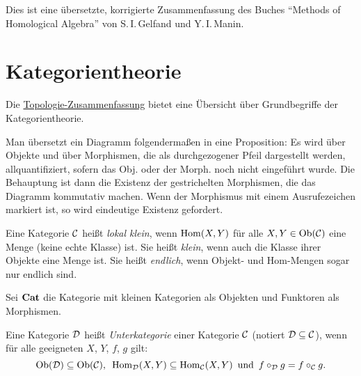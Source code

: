 \documentclass{cheat-sheet}
\begin{document}

Dies ist eine übersetzte, korrigierte Zusammenfassung des Buches "`Methods of Homological Algebra"' von S.\,I.\,Gelfand und Y.\,I.\,Manin.



\section{Kategorientheorie}

\begin{bem}
  Die \href{http://timbaumann.info/uni-spicker/topo.pdf}{Topologie-Zusammenfassung} bietet eine Übersicht über Grundbegriffe der Kategorientheorie.
\end{bem}

\begin{konv}
  Man übersetzt ein Diagramm folgendermaßen in eine Proposition:
  Es wird über Objekte und über Morphismen, die als durchgezogener Pfeil dargestellt werden, allquantifiziert, sofern das Obj. oder der Morph. noch nicht eingeführt wurde.
  Die Behauptung ist dann die Existenz der gestrichelten Morphismen, die das Diagramm kommutativ machen. Wenn der Morphismus mit einem Ausrufezeichen markiert ist, so wird eindeutige Existenz gefordert.
\end{konv}

\begin{defn}
  Eine Kategorie $\mathcal{C}$ heißt \emph{lokal klein}, wenn $\operatorname{Hom}(X, Y)$ für alle $X, Y \in \operatorname{Ob}(\mathcal{C})$ eine Menge (keine echte Klasse) ist.
  Sie heißt \emph{klein}, wenn auch die Klasse ihrer Objekte eine Menge ist.
  Sie heißt \emph{endlich}, wenn Objekt- und Hom-Mengen sogar nur endlich sind.
\end{defn}

\begin{defn}
  Sei $\mathbf{Cat}$ die Kategorie mit kleinen Kategorien als Objekten und Funktoren als Morphismen.
\end{defn}



\begin{defn}
  Eine Kategorie $\mathcal{D}$ heißt \emph{Unterkategorie} einer Kategorie $\mathcal{C}$ (notiert $\mathcal{D} \subseteq \mathcal{C}$), wenn für alle geeigneten $X$, $Y$, $f$, $g$ gilt:
  \[
    \operatorname{Ob}(\mathcal{D}) \subseteq \operatorname{Ob}(\mathcal{C}), \enspace
    \operatorname{Hom}_{\mathcal{D}}(X, Y) \subseteq \operatorname{Hom}_{\mathcal{C}}(X, Y) \enspace \text{und} \enspace
    f \circ_{\mathcal{D}} g = f \circ_{\mathcal{C}} g.
  \]
\end{defn}
\end{document}
